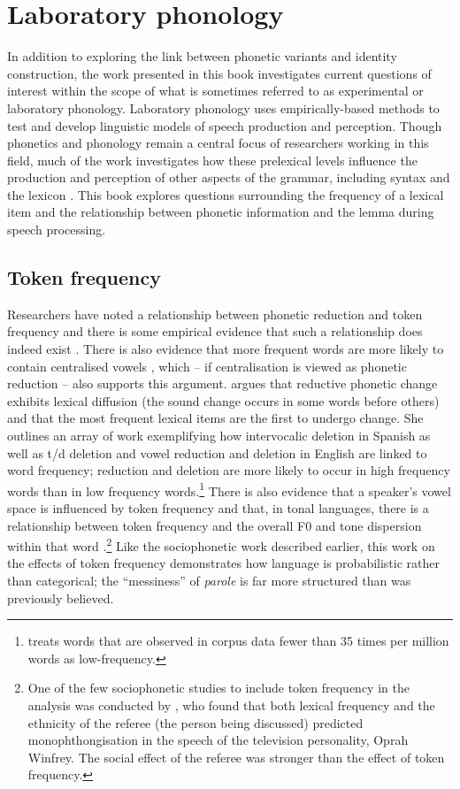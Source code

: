 \section{Laboratory phonology}
In addition to exploring the link between phonetic variants and identity construction, the work presented in this book investigates current questions of interest within the scope of what is sometimes referred to as experimental or laboratory phonology. Laboratory phonology uses empirically-based methods to test and develop linguistic models of speech production and perception. Though phonetics and phonology remain a central focus of researchers working in this field, much of the work investigates how these prelexical levels influence the production and perception of other aspects of the grammar, including syntax \citep{haybresnan2006} and the lexicon \citep{bybee2002,gahl-thyme}. This book explores questions surrounding the frequency of a lexical item and the relationship between phonetic information and the lemma during speech processing.
 
	
	\subsection{Token frequency}\label{sec:frequency}
Researchers have noted a relationship between phonetic reduction and token frequency \citep{bybee2001,zipf1929} and there is some empirical evidence that such a relationship does indeed exist \citep{aylettturk2004,bakerbradlow2009,belletal2009}. There is also evidence that more frequent words are more likely to contain centralised vowels \citep{aylettturk2006,munsonsolomon2004}, which -- if centralisation is viewed as phonetic reduction -- also supports this argument. \citet{bybee2002} argues that reductive phonetic change exhibits lexical diffusion (the sound change occurs in some words before others) and that the most frequent lexical items are the first to undergo change. She outlines an array of work exemplifying how intervocalic  deletion in Spanish as well as t/d deletion and vowel reduction and deletion in English are linked to word frequency; reduction and deletion are more likely to occur in high frequency words than in low frequency words.\footnote{\citet{bybee2002} treats words that are observed in corpus data fewer than 35 times per million words as low-frequency.} There is also evidence that a speaker's vowel space is influenced by token frequency \citep{munson2007} and that, in tonal languages, there is a relationship between token frequency and the overall F0 and tone dispersion within that word \citep{zhaojurafsky2007}.\footnote{One of the few sociophonetic studies to include token frequency in the analysis was conducted by \citet{oprah1999}, who found that both lexical frequency and the ethnicity of the referee (the person being discussed) predicted  monophthongisation in the speech of the television personality, Oprah Winfrey. The social effect of the referee was stronger than the effect of token frequency.} Like the sociophonetic work described earlier, this work on the effects of token frequency demonstrates how language is probabilistic rather than categorical; the ``messiness'' of \textit{parole} is far more structured than was previously believed.


